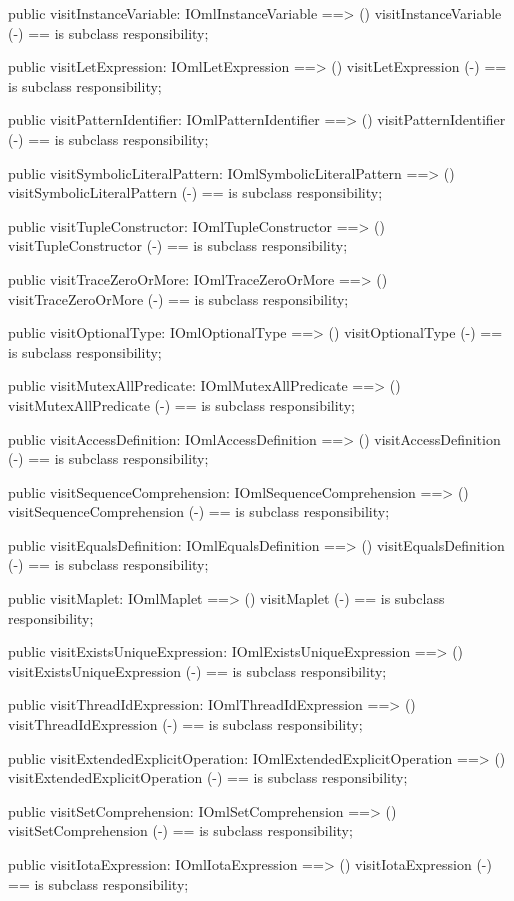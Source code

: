 \begin{vdm_al}
  public visitInstanceVariable: IOmlInstanceVariable ==> ()
  visitInstanceVariable (-) == is subclass responsibility;

  public visitLetExpression: IOmlLetExpression ==> ()
  visitLetExpression (-) == is subclass responsibility;

  public visitPatternIdentifier: IOmlPatternIdentifier ==> ()
  visitPatternIdentifier (-) == is subclass responsibility;

  public visitSymbolicLiteralPattern: IOmlSymbolicLiteralPattern ==> ()
  visitSymbolicLiteralPattern (-) == is subclass responsibility;

  public visitTupleConstructor: IOmlTupleConstructor ==> ()
  visitTupleConstructor (-) == is subclass responsibility;

  public visitTraceZeroOrMore: IOmlTraceZeroOrMore ==> ()
  visitTraceZeroOrMore (-) == is subclass responsibility;

  public visitOptionalType: IOmlOptionalType ==> ()
  visitOptionalType (-) == is subclass responsibility;

  public visitMutexAllPredicate: IOmlMutexAllPredicate ==> ()
  visitMutexAllPredicate (-) == is subclass responsibility;

  public visitAccessDefinition: IOmlAccessDefinition ==> ()
  visitAccessDefinition (-) == is subclass responsibility;

  public visitSequenceComprehension: IOmlSequenceComprehension ==> ()
  visitSequenceComprehension (-) == is subclass responsibility;

  public visitEqualsDefinition: IOmlEqualsDefinition ==> ()
  visitEqualsDefinition (-) == is subclass responsibility;

  public visitMaplet: IOmlMaplet ==> ()
  visitMaplet (-) == is subclass responsibility;

  public visitExistsUniqueExpression: IOmlExistsUniqueExpression ==> ()
  visitExistsUniqueExpression (-) == is subclass responsibility;

  public visitThreadIdExpression: IOmlThreadIdExpression ==> ()
  visitThreadIdExpression (-) == is subclass responsibility;

  public visitExtendedExplicitOperation: IOmlExtendedExplicitOperation ==> ()
  visitExtendedExplicitOperation (-) == is subclass responsibility;

  public visitSetComprehension: IOmlSetComprehension ==> ()
  visitSetComprehension (-) == is subclass responsibility;

  public visitIotaExpression: IOmlIotaExpression ==> ()
  visitIotaExpression (-) == is subclass responsibility;


\end{vdm_al}
